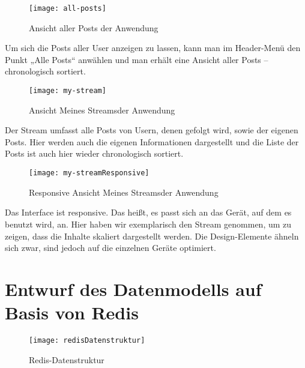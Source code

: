 \newpage
    \begin{figure}[!htb]
      \begin{center}
          \texttt{[image: all-posts]}
        \caption{Ansicht aller Posts der Anwendung}
        \label{fig:all-posts}
      \end{center}
    \end{figure}

    Um sich die Posts aller User anzeigen zu lassen, kann man im Header-Menü den Punkt „Alle Posts“ anwählen und man erhält eine Ansicht aller Posts – chronologisch sortiert.

\newpage
    \begin{figure}[!htb]
      \begin{center}
          \texttt{[image: my-stream]}
        \caption{Ansicht \glqq Meines Streams\grqq der Anwendung}
        \label{fig:my-stream}
      \end{center}
    \end{figure}

    Der Stream umfasst alle Posts von Usern, denen gefolgt wird, sowie der eigenen Posts. Hier werden auch die eigenen Informationen dargestellt und die Liste der Posts ist auch hier wieder chronologisch sortiert.

\newpage
    \begin{figure}[!htb]
      \begin{center}
          \texttt{[image: my-streamResponsive]}
        \caption{Responsive Ansicht \glqq Meines Streams\grqq der Anwendung}
        \label{fig:my-streamResponsive}
      \end{center}
    \end{figure}

    Das Interface ist responsive. Das heißt, es passt sich an das Gerät, auf dem es benutzt wird, an. Hier haben wir exemplarisch den Stream genommen, um zu zeigen, dass die Inhalte skaliert dargestellt werden. Die Design-Elemente ähneln sich zwar, sind jedoch auf die einzelnen Geräte optimiert.

\newpage
  \section{Entwurf des Datenmodells auf Basis von Redis}

  \begin{figure}[!htb]
    \begin{center}
        \texttt{[image: redisDatenstruktur]}
      \caption{Redis-Datenstruktur}
      \label{fig:redisDatenstruktur}
    \end{center}
  \end{figure}

